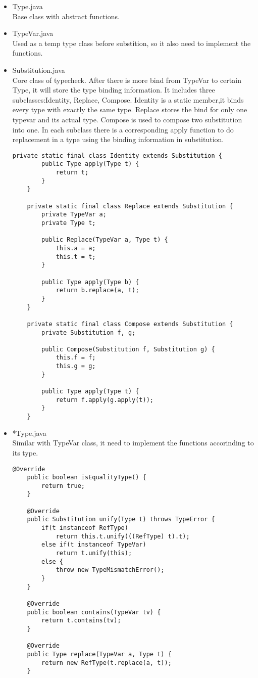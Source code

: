 \documentclass[paper=a4, fontsize=11pt]{scrartcl}
\begin{document}
\begin{itemize}
\item Type.java \\
Base class with abstract functions.
\item TypeVar.java \\
Used as a temp type class before substition, so it also need to implement the functions.
\item Substitution.java \\
Core class of typecheck. After there is more bind from TypeVar to certain Type, it will store the type binding information. It includes three subclasses:Identity, Replace, Compose. Identity is a static member,it binds every type with exactly the same type. Replace stores the bind for only one typevar and its actual type. Compose is used to compose two substitution into one. In each subclass there is a corresponding apply function to do replacement in a type using the binding information in substitution.
\begin{lstlisting}[title=Substitution, frame=shadowbox]
    private static final class Identity extends Substitution {
        public Type apply(Type t) {
            return t;
        }
    }

    private static final class Replace extends Substitution {
        private TypeVar a;
        private Type t;

        public Replace(TypeVar a, Type t) {
            this.a = a;
            this.t = t;
        }

        public Type apply(Type b) {
            return b.replace(a, t);
        }
    }

    private static final class Compose extends Substitution {
        private Substitution f, g;

        public Compose(Substitution f, Substitution g) {
            this.f = f;
            this.g = g;
        }

        public Type apply(Type t) {
            return f.apply(g.apply(t));
        }
    }
\end{lstlisting}
\item *Type.java \\
Similar with TypeVar class, it need to implement the functions accorinding to its type.
\begin{lstlisting}[title=RefType, frame=shadowbox]
    @Override
    public boolean isEqualityType() {
        return true;
    }

    @Override
    public Substitution unify(Type t) throws TypeError {
        if(t instanceof RefType)
            return this.t.unify(((RefType) t).t);
        else if(t instanceof TypeVar)
            return t.unify(this);
        else {
            throw new TypeMismatchError();
        }
    }

    @Override
    public boolean contains(TypeVar tv) {
        return t.contains(tv);
    }

    @Override
    public Type replace(TypeVar a, Type t) {
        return new RefType(t.replace(a, t));
    }

\end{lstlisting}

\end{itemize}
\end{document}
